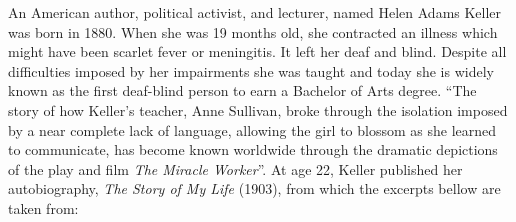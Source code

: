
An American author, political activist, and lecturer, named Helen Adams Keller was born in 1880. 
When she was 19 months old, she contracted an illness which might have been scarlet fever or meningitis. 
It left her deaf and blind. Despite all difficulties imposed by her impairments she was taught and today 
she is widely known as the first deaf-blind person to earn a Bachelor of Arts degree. 
``The story of how Keller's teacher, Anne Sullivan, broke through the isolation imposed by a near 
complete lack of language, allowing the girl to blossom as she learned to communicate, has become known worldwide 
through the dramatic depictions of the play and film \textit{The Miracle Worker}''. 
At age 22, Keller published her autobiography, \textit{The Story of My Life} (1903), from which the excerpts bellow are taken from:

